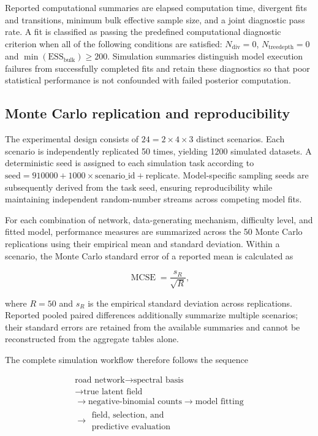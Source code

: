 \documentclass[11pt]{article}
\begin{document}
Reported computational summaries are elapsed computation time, divergent fits and transitions, minimum bulk effective sample size, and a joint diagnostic pass rate. A fit is classified as passing the predefined computational diagnostic criterion when all of the following conditions are satisfied: $N_{\mathrm{div}}=0$, $N_{\mathrm{treedepth}}=0$ and $\min(\mathrm{ESS}_{\mathrm{bulk}})\geq200.$ Simulation summaries distinguish model execution failures from successfully completed fits and retain these diagnostics so that poor statistical performance is not confounded with failed posterior computation.

\subsection{Monte Carlo replication and reproducibility}

The experimental design consists of $24 =2\times4\times3$ distinct scenarios. Each scenario is independently replicated 50 times, yielding 1200 simulated datasets. A deterministic seed is assigned to each simulation task according to $\mathrm{seed}
= 910000 + 1000\times\mathrm{scenario\_id} + \mathrm{replicate}$.  Model-specific sampling seeds are subsequently derived from the task seed, ensuring reproducibility while maintaining independent random-number streams across competing model fits.

For each combination of network, data-generating mechanism, difficulty level, and fitted model, performance measures are summarized across the 50 Monte Carlo replications using their empirical mean and standard deviation. Within a scenario, the Monte Carlo standard error of a reported mean is calculated as

\[
\operatorname{MCSE}
=
\frac{s_R}{\sqrt{R}},
\]

where $R=50$ and $s_R$ is the empirical standard deviation across replications. Reported pooled paired differences additionally summarize multiple scenarios; their standard errors are retained from the available summaries and cannot be reconstructed from the aggregate tables alone.

The complete simulation workflow therefore follows the sequence

\[
\boxed{
	\begin{gathered}
		\text{road network}
		\longrightarrow
		\text{spectral basis}\\[0.25em]
		\longrightarrow\text{true latent field}
		\\[0.25em]
		\longrightarrow
		\text{negative-binomial counts}
		\longrightarrow
		\text{model fitting}
		\\[0.25em]
		\longrightarrow
		\begin{gathered}\text{field, selection, and}\\\text{predictive evaluation}\end{gathered}
	\end{gathered}
}
\]
\end{document}
